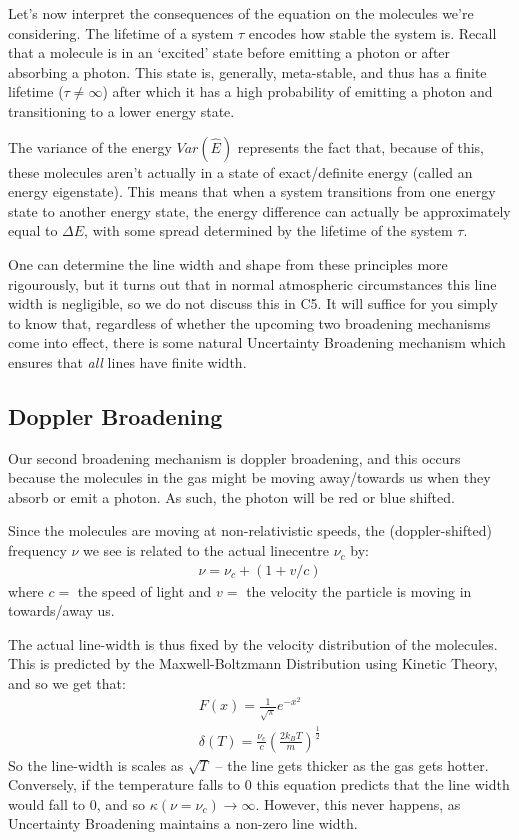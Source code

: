 Let's now interpret the consequences of the equation on the molecules we're considering. The lifetime of a system $\tau$ encodes how stable the system is. Recall that a molecule is in an `excited' state before emitting a photon or after absorbing a photon. This state is, generally, meta-stable, and thus has a finite lifetime ($\tau\neq\infty$) after which it has a high probability of emitting a photon and transitioning to a lower energy state.

The variance of the energy $Var(\hat{E})$ represents the fact that, because of this, these molecules aren't actually in a state of exact/definite energy (called an energy eigenstate). This means that when a system transitions from one energy state to another energy state, the energy difference can actually be approximately equal to $\Delta E$, with some spread determined by the lifetime of the system $\tau$.

One can determine the line width and shape from these principles more rigourously, but it turns out that in normal atmospheric circumstances this line width is negligible, so we do not discuss this in C5. It will suffice for you simply to know that, regardless of whether the upcoming two broadening mechanisms come into effect, there is some natural Uncertainty Broadening mechanism which ensures that \textit{all} lines have finite width.

\subsection{Doppler Broadening}

Our second broadening mechanism is doppler broadening, and this occurs because the molecules in the gas might be moving away/towards us when they absorb or emit a photon. As such, the photon will be red or blue shifted.

Since the molecules are moving at non-relativistic speeds, the (doppler-shifted) frequency $\nu$ we see is related to the actual linecentre $\nu_c$ by:
\begin{align*}
    \nu=\nu_c+(1+v/c)
\end{align*}
where $c=$ the speed of light and $v=$ the velocity the particle is moving in towards/away us.

The actual line-width is thus fixed by the velocity distribution of the molecules. This is predicted by the Maxwell-Boltzmann Distribution using Kinetic Theory, and so we get that:
\begin{gather}
    \label{Doppler Broadening F}
    \boxed{
        F(x)=\frac{1}{\sqrt{\pi}}e^{-x^2}
    }\\
    \label{Doppler Broadening delt}
    \boxed{
        \delta(T) = \frac{\nu_c}{c}\left( \frac{2k_BT}{m} \right)^{\frac{1}{2}}
    }
\end{gather}
So the line-width is scales as $\sqrt{T}$ – the line gets thicker as the gas gets hotter. Conversely, if the temperature falls to $0$ this equation predicts that the line width would fall to $0$, and so $\kappa(\nu=\nu_c)\to\infty$. However, this never happens, as Uncertainty Broadening maintains a non-zero line width.

